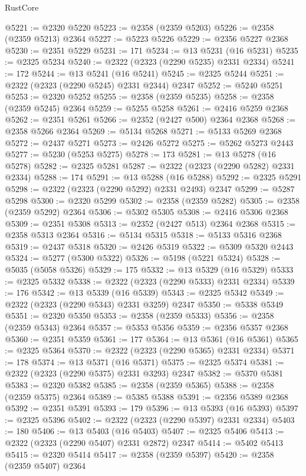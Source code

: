 \begin{lexlean}{RustCore}
\begin{coremodule}
@5221 := @2320 @5220
@5223 := @2358 (@2359 @5203)
@5226 := @2358 (@2359 @5213) @2364
@5227 := @5223 @5226
@5229 := @2356 @5227 @2368
@5230 := @2351 @5229
@5231 := 171
@5234 := @13 @5231 (@16 @5231)
@5235 := @2325 @5234
@5240 := @2322 (@2323 (@2290 @5235) @2331 @2334)
@5241 := 172
@5244 := @13 @5241 (@16 @5241)
@5245 := @2325 @5244
@5251 := @2322 (@2323 (@2290 @5245) @2331 @2344) @2347
@5252 := @5240 @5251
@5253 := @2320 @5252
@5255 := @2358 (@2359 @5235)
@5258 := @2358 (@2359 @5245) @2364
@5259 := @5255 @5258
@5261 := @2416 @5259 @2368
@5262 := @2351 @5261
@5266 := @2352 (@2427 @500) @2364 @2368
@5268 := @2358 @5266 @2364
@5269 := @5134 @5268
@5271 := @5133 @5269 @2368
@5272 := @2437 @5271
@5273 := @2426 @5272
@5275 := @5262 @5273 @2443
@5277 := @5230 (@5253 @5275)
@5278 := 173
@5281 := @13 @5278 (@16 @5278)
@5282 := @2325 @5281
@5287 := @2322 (@2323 (@2290 @5282) @2331 @2334)
@5288 := 174
@5291 := @13 @5288 (@16 @5288)
@5292 := @2325 @5291
@5298 := @2322 (@2323 (@2290 @5292) @2331 @2493) @2347
@5299 := @5287 @5298
@5300 := @2320 @5299
@5302 := @2358 (@2359 @5282)
@5305 := @2358 (@2359 @5292) @2364
@5306 := @5302 @5305
@5308 := @2416 @5306 @2368
@5309 := @2351 @5308
@5313 := @2352 (@2427 @513) @2364 @2368
@5315 := @2358 @5313 @2364
@5316 := @5134 @5315
@5318 := @5133 @5316 @2368
@5319 := @2437 @5318
@5320 := @2426 @5319
@5322 := @5309 @5320 @2443
@5324 := @5277 (@5300 @5322)
@5326 := @5198 (@5221 @5324)
@5328 := @5035 (@5058 @5326)
@5329 := 175
@5332 := @13 @5329 (@16 @5329)
@5333 := @2325 @5332
@5338 := @2322 (@2323 (@2290 @5333) @2331 @2334)
@5339 := 176
@5342 := @13 @5339 (@16 @5339)
@5343 := @2325 @5342
@5349 := @2322 (@2323 (@2290 @5343) @2331 @3259) @2347
@5350 := @5338 @5349
@5351 := @2320 @5350
@5353 := @2358 (@2359 @5333)
@5356 := @2358 (@2359 @5343) @2364
@5357 := @5353 @5356
@5359 := @2356 @5357 @2368
@5360 := @2351 @5359
@5361 := 177
@5364 := @13 @5361 (@16 @5361)
@5365 := @2325 @5364
@5370 := @2322 (@2323 (@2290 @5365) @2331 @2334)
@5371 := 178
@5374 := @13 @5371 (@16 @5371)
@5375 := @2325 @5374
@5381 := @2322 (@2323 (@2290 @5375) @2331 @3293) @2347
@5382 := @5370 @5381
@5383 := @2320 @5382
@5385 := @2358 (@2359 @5365)
@5388 := @2358 (@2359 @5375) @2364
@5389 := @5385 @5388
@5391 := @2356 @5389 @2368
@5392 := @2351 @5391
@5393 := 179
@5396 := @13 @5393 (@16 @5393)
@5397 := @2325 @5396
@5402 := @2322 (@2323 (@2290 @5397) @2331 @2334)
@5403 := 180
@5406 := @13 @5403 (@16 @5403)
@5407 := @2325 @5406
@5413 := @2322 (@2323 (@2290 @5407) @2331 @2872) @2347
@5414 := @5402 @5413
@5415 := @2320 @5414
@5417 := @2358 (@2359 @5397)
@5420 := @2358 (@2359 @5407) @2364

\end{coremodule}
\end{lexlean}
